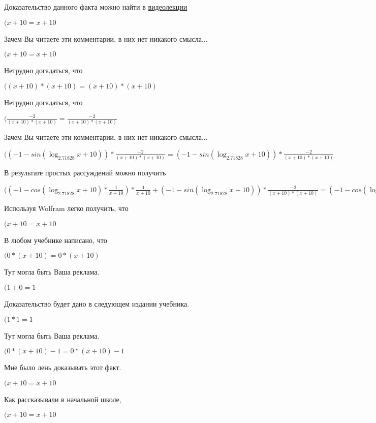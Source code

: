 \documentclass[12pt,a4paper,fleqn]{article}
\theoremstyle{definition}
\begin{document}
Доказательство данного факта можно найти в \href{https://www.youtube.com/watch?v=dQw4w9WgXcQ}{видеолекции}

$( x  +  10  =  x  +  10 $

Зачем Вы читаете эти комментарии, в них нет никакого смысла...

$( x  +  10  =  x  +  10 $

Нетрудно догадаться, что

$(( x  +  10 ) * ( x  +  10 ) = ( x  +  10 ) * ( x  +  10 )$

Нетрудно догадаться, что

$(\frac{ -2 }{( x  +  10 ) * ( x  +  10 )}
 = \frac{ -2 }{( x  +  10 ) * ( x  +  10 )}
$

Зачем Вы читаете эти комментарии, в них нет никакого смысла...

$(( -1  - sin(\log_{ 2.71828 }{ x  +  10 })) * \frac{ -2 }{( x  +  10 ) * ( x  +  10 )}
 = ( -1  - sin(\log_{ 2.71828 }{ x  +  10 })) * \frac{ -2 }{( x  +  10 ) * ( x  +  10 )}
$

В результате простых рассуждений можно получить

$(( -1  - cos(\log_{ 2.71828 }{ x  +  10 }) * \frac{ 1 }{ x  +  10 }
) * \frac{ 1 }{ x  +  10 }
 + ( -1  - sin(\log_{ 2.71828 }{ x  +  10 })) * \frac{ -2 }{( x  +  10 ) * ( x  +  10 )}
 = ( -1  - cos(\log_{ 2.71828 }{ x  +  10 }) * \frac{ 1 }{ x  +  10 }
) * \frac{ 1 }{ x  +  10 }
 + ( -1  - sin(\log_{ 2.71828 }{ x  +  10 })) * \frac{ -2 }{( x  +  10 ) * ( x  +  10 )}
$

Используя Wolfram легко получить, что

$( x  +  10  =  x  +  10 $

В любом учебнике написано, что

$( 0  * ( x  +  10 ) =  0  * ( x  +  10 )$

Тут могла быть Ваша реклама.

$( 1  +  0  =  1 $

Доказательство будет дано в следующем издании учебника.

$( 1  *  1  =  1 $

Тут могла быть Ваша реклама.

$( 0  * ( x  +  10 ) -  1  =  0  * ( x  +  10 ) -  1 $

Мне было лень доказывать этот факт.

$( x  +  10  =  x  +  10 $

Как рассказывали в начальной школе,

$( x  +  10  =  x  +  10 $
\end{document}
